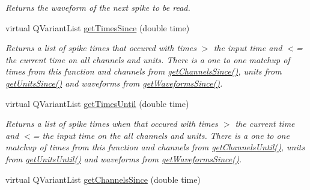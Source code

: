 \begin{DoxyCompactItemize}
\begin{DoxyCompactList}\small\item\em Returns the waveform of the next spike to be read. \end{DoxyCompactList}\item 
\hypertarget{class_picto_1_1_live_spike_reader_adf4156ef2c32edfee42a7a82a63b0808}{virtual Q\-Variant\-List \hyperlink{class_picto_1_1_live_spike_reader_adf4156ef2c32edfee42a7a82a63b0808}{get\-Times\-Since} (double time)}\label{class_picto_1_1_live_spike_reader_adf4156ef2c32edfee42a7a82a63b0808}

\begin{DoxyCompactList}\small\item\em Returns a list of spike times that occured with times $>$ the input time and $<$= the current time on all channels and units. There is a one to one matchup of times from this function and channels from \hyperlink{class_picto_1_1_live_spike_reader_aa5b2f11f42b9d6a946ca1a8123aa0bc1}{get\-Channels\-Since()}, units from \hyperlink{class_picto_1_1_live_spike_reader_a534fac19991435569beae1d2abda0446}{get\-Units\-Since()} and waveforms from \hyperlink{class_picto_1_1_live_spike_reader_a177e75e33b122f46f6836ca2b04d2ea0}{get\-Waveforms\-Since()}. \end{DoxyCompactList}\item 
\hypertarget{class_picto_1_1_live_spike_reader_af76447878e8fcf2d18b92a7739baed80}{virtual Q\-Variant\-List \hyperlink{class_picto_1_1_live_spike_reader_af76447878e8fcf2d18b92a7739baed80}{get\-Times\-Until} (double time)}\label{class_picto_1_1_live_spike_reader_af76447878e8fcf2d18b92a7739baed80}

\begin{DoxyCompactList}\small\item\em Returns a list of spike times when that occured with times $>$ the current time and $<$= the input time on the all channels and units. There is a one to one matchup of times from this function and channels from \hyperlink{class_picto_1_1_live_spike_reader_a8068875b5d7ff0785ba6e21e2b947681}{get\-Channels\-Until()}, units from \hyperlink{class_picto_1_1_live_spike_reader_ad285c7f58f3d0e910a969ae351da6198}{get\-Units\-Until()} and waveforms from \hyperlink{class_picto_1_1_live_spike_reader_a177e75e33b122f46f6836ca2b04d2ea0}{get\-Waveforms\-Since()}. \end{DoxyCompactList}\item 
\hypertarget{class_picto_1_1_live_spike_reader_aa5b2f11f42b9d6a946ca1a8123aa0bc1}{virtual Q\-Variant\-List \hyperlink{class_picto_1_1_live_spike_reader_aa5b2f11f42b9d6a946ca1a8123aa0bc1}{get\-Channels\-Since} (double time)}\label{class_picto_1_1_live_spike_reader_aa5b2f11f42b9d6a946ca1a8123aa0bc1}


\end{DoxyCompactItemize}
